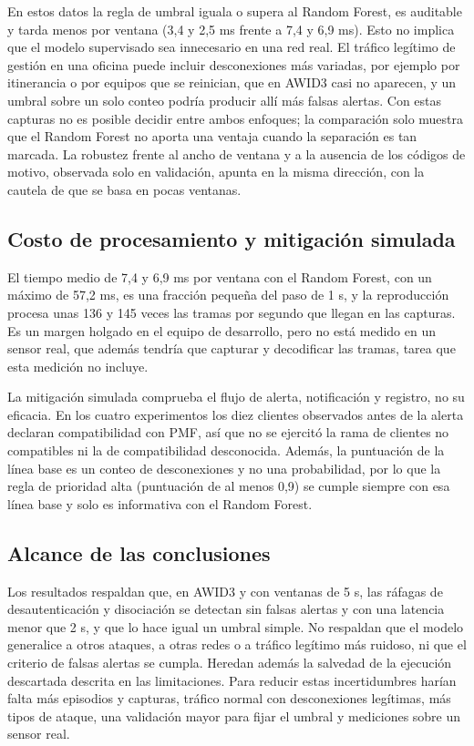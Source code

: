 \documentclass[journal]{IEEEtran}
\begin{document}
En estos datos la regla de umbral iguala o supera al Random Forest, es auditable y tarda menos por ventana (3,4 y 2,5 ms frente a 7,4 y 6,9 ms). Esto no implica que el modelo supervisado sea innecesario en una red real. El tráfico legítimo de gestión en una oficina puede incluir desconexiones más variadas, por ejemplo por itinerancia o por equipos que se reinician, que en AWID3 casi no aparecen, y un umbral sobre un solo conteo podría producir allí más falsas alertas. Con estas capturas no es posible decidir entre ambos enfoques; la comparación solo muestra que el Random Forest no aporta una ventaja cuando la separación es tan marcada. La robustez frente al ancho de ventana y a la ausencia de los códigos de motivo, observada solo en validación, apunta en la misma dirección, con la cautela de que se basa en pocas ventanas.

\subsection{Costo de procesamiento y mitigación simulada}

El tiempo medio de 7,4 y 6,9 ms por ventana con el Random Forest, con un máximo de 57,2 ms, es una fracción pequeña del paso de 1 s, y la reproducción procesa unas 136 y 145 veces las tramas por segundo que llegan en las capturas. Es un margen holgado en el equipo de desarrollo, pero no está medido en un sensor real, que además tendría que capturar y decodificar las tramas, tarea que esta medición no incluye.

La mitigación simulada comprueba el flujo de alerta, notificación y registro, no su eficacia. En los cuatro experimentos los diez clientes observados antes de la alerta declaran compatibilidad con PMF, así que no se ejercitó la rama de clientes no compatibles ni la de compatibilidad desconocida. Además, la puntuación de la línea base es un conteo de desconexiones y no una probabilidad, por lo que la regla de prioridad alta (puntuación de al menos 0,9) se cumple siempre con esa línea base y solo es informativa con el Random Forest.

\subsection{Alcance de las conclusiones}

Los resultados respaldan que, en AWID3 y con ventanas de 5 s, las ráfagas de desautenticación y disociación se detectan sin falsas alertas y con una latencia menor que 2 s, y que lo hace igual un umbral simple. No respaldan que el modelo generalice a otros ataques, a otras redes o a tráfico legítimo más ruidoso, ni que el criterio de falsas alertas se cumpla. Heredan además la salvedad de la ejecución descartada descrita en las limitaciones. Para reducir estas incertidumbres harían falta más episodios y capturas, tráfico normal con desconexiones legítimas, más tipos de ataque, una validación mayor para fijar el umbral y mediciones sobre un sensor real.
\end{document}
